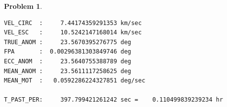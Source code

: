 \documentclass[10pt]{article}
\theoremstyle{definition}
\newtheorem{prob}{Problem}[section]
\begin{document}
\begin{prob}
\begin{verbatim}
VEL_CIRC  :     7.44174359291353 km/sec                              
VEL_ESC   :     10.5242147168014 km/sec                              
TRUE_ANOM :     23.5670395276775 deg                                 
FPA       :  0.00296381303849746 deg                                 
ECC_ANOM  :     23.5640755388789 deg                                 
MEAN_ANOM :     23.5611117258625 deg                                 
MEAN_MOT  :   0.0592286224327851 deg/sec                             

T_PAST_PER:     397.799421261242 sec =    0.110499839239234 hr
    \end{verbatim}
\end{prob}
\end{document}
